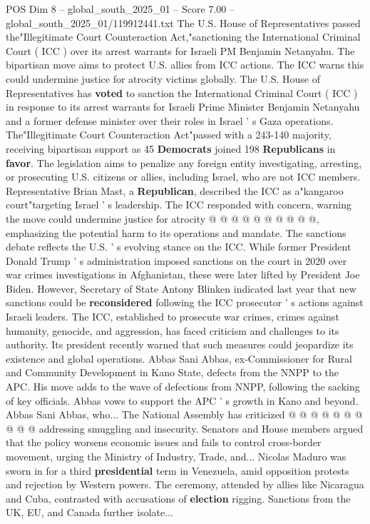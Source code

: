 \begin{textsample}{POS Dim 8 – global\_south\_2025\_01 – Score 7.00 – global\_south\_2025\_01/119912441.txt}  \label{ex:f8_pos_320}
The U.S.
House of Representatives passed the"Illegitimate Court Counteraction Act,"sanctioning the International Criminal Court ( ICC ) over its arrest warrants for Israeli PM Benjamin Netanyahu.
The bipartisan move aims to protect U.S. allies from ICC actions.
The ICC warns this could undermine justice for atrocity victims globally.
The U.S.
House of Representatives has \textbf{voted} to sanction the International Criminal Court ( ICC ) in response to its arrest warrants for Israeli Prime Minister Benjamin Netanyahu and a former defense minister over their roles in Israel ' s Gaza operations.
The"Illegitimate Court Counteraction Act"passed with a 243-140 majority, receiving bipartisan support as 45 \textbf{Democrats} joined 198 \textbf{Republicans} in \textbf{favor}.
The legislation aims to penalize any foreign entity investigating, arresting, or prosecuting U.S. citizens or allies, including Israel, who are not ICC members.
Representative Brian Mast, a \textbf{Republican}, described the ICC as a"kangaroo court"targeting Israel ' s leadership.
The ICC responded with concern, warning the move could undermine justice for atrocity @ @ @ @ @ @ @ @ @ @, emphasizing the potential harm to its operations and mandate.
The sanctions debate reflects the U.S. ' s evolving stance on the ICC.
While former President Donald Trump ' s administration imposed sanctions on the court in 2020 over war crimes investigations in Afghanistan, these were later lifted by President Joe Biden.
However, Secretary of State Antony Blinken indicated last year that new sanctions could be \textbf{reconsidered} following the ICC prosecutor ' s actions against Israeli leaders.
The ICC, established to prosecute war crimes, crimes against humanity, genocide, and aggression, has faced criticism and challenges to its authority.
Its president recently warned that such measures could jeopardize its existence and global operations.
Abbas Sani Abbas, ex-Commissioner for Rural and Community Development in Kano State, defects from the NNPP to the APC.
His move adds to the wave of defections from NNPP, following the sacking of key officials.
Abbas vows to support the APC ' s growth in Kano and beyond.
Abbas Sani Abbas, who...
The National Assembly has criticized @ @ @ @ @ @ @ @ @ @ addressing smuggling and insecurity.
Senators and House members argued that the policy worsens economic issues and fails to control cross-border movement, urging the Ministry of Industry, Trade, and...
Nicolas Maduro was sworn in for a third \textbf{presidential} term in Venezuela, amid opposition protests and rejection by Western powers.
The ceremony, attended by allies like Nicaragua and Cuba, contrasted with accusations of \textbf{election} rigging.
Sanctions from the UK, EU, and Canada further isolate...

\end{textsample}
